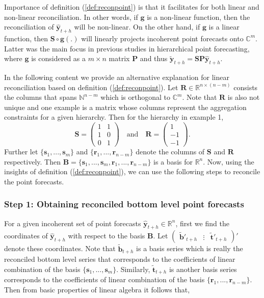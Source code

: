 \documentclass[a4paper, 11pt]{article}
\begin{document}
	Importance of definition (\ref{def:reconpoint}) is that it facilitates for both linear and non-linear reconciliation. In other words, if $\bm{g}$ is a non-linear function, then the reconciliation of $\hat{\bm{y}}_{t+h}$ will be non-linear. On the other hand, if $\bm{g}$ is a linear function, then $\bm{S}\circ \bm{g}(.)$ will linearly projects incoherent point forecasts onto $\bm{\mathbb{C}}^m$. Latter was the main focus in previous studies in hierarchical point forecasting, where $\bm{g}$ is considered as a $m \times n$ matrix $\bm{P}$ and thus $\tilde{\bm{y}}_{t+h}=\bm{S}\bm{P} \hat{\bm{y}}_{t+h}$. 
	
	In the following content we provide an alternative explanation for linear reconciliation based on definition (\ref{def:reconpoint}). Let $\bm{R} \in \bm{\mathbb{R}}^{n \times (n-m)}$ consists the columns that spans $\bm{\mathbb{N}}^{n-m}$ which is orthogonal to $\bm{\mathbb{C}}^m$. Note that $\bm{R}$ is also not unique and one example is a matrix whose columns represent the aggregation constraints for a given hierarchy. Then for the hierarchy in example 1, 
	$$ 
	\mathbold{S} = 
	\begin{pmatrix} 
	1& 1 \\ 1 & 0 \\ 0&1 
	\end{pmatrix} 
	\quad \text{and} \quad 
	\mathbold{R} = 
	\begin{pmatrix}  
	1 \\ -1 \\ -1 
	\end{pmatrix}.
	$$ 
	\noindent
	Further let $\{\bm{s}_1,...,\bm{s}_m\}$ and $\{\bm{r}_1,...,\bm{r}_{n-m}\}$ denote the columns of $\bm{S}$ and $\bm{R}$ respectively. Then $\bm{B}=\{\bm{s}_1,...,\bm{s}_m, \bm{r}_1,...,\bm{r}_{n-m}\}$ is a basis for $\bm{\mathbb{R}}^n$. Now, using the insights of definition (\ref{def:reconpoint}), we can use the following steps to reconcile the point forecasts.
	
	\subsubsection*{Step 1: Obtaining reconciled bottom level point forecasts}
	
	For a given incoherent set of point forecasts $\hat{\bm{y}}_{t+h} \in \bm{\mathbb{R}}^n$, first we find the coordinates of $\hat{\bm{y}}_{t+h}$ with respect to the basis $\bm{B}$. Let $\begin{pmatrix}\tilde{\bm{b}}'_{t+h} & \vdots& \tilde{\bm{t}}'_{t+h}\end{pmatrix}'$ denote these coordinates. Note that $\tilde{\bm{b}}_{t+h}$ is a basis series which is really the reconciled bottom level series that corresponds to the coefficients of linear combination of the basis $\{\bm{s}_1,...,\bm{s}_m\}$. Similarly, $\tilde{\bm{t}}_{t+h}$ is another basis series corresponds to the coefficients of linear combination of the basis $\{\bm{r}_1,...,\bm{r}_{n-m}\}$. Then from basic properties of linear algebra it follows that, 
	
\end{document}
